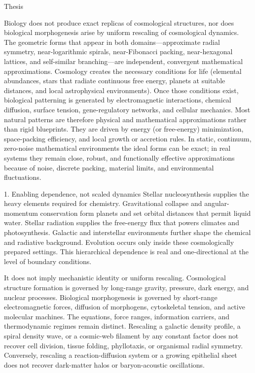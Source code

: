 Thesis

Biology does not produce exact replicas of cosmological structures, nor does biological morphogenesis arise by uniform rescaling of cosmological dynamics. The geometric forms that appear in both domains—approximate radial symmetry, near-logarithmic spirals, near-Fibonacci packing, near-hexagonal lattices, and self-similar branching—are independent, convergent mathematical approximations. Cosmology creates the necessary conditions for life (elemental abundances, stars that radiate continuous free energy, planets at suitable distances, and local astrophysical environments). Once those conditions exist, biological patterning is generated by electromagnetic interactions, chemical diffusion, surface tension, gene-regulatory networks, and cellular mechanics. Most natural patterns are therefore physical and mathematical approximations rather than rigid blueprints. They are driven by energy (or free-energy) minimization, space-packing efficiency, and local growth or accretion rules. In static, continuum, zero-noise mathematical environments the ideal forms can be exact; in real systems they remain close, robust, and functionally effective approximations because of noise, discrete packing, material limits, and environmental fluctuations.

1. Enabling dependence, not scaled dynamics
Stellar nucleosynthesis supplies the heavy elements required for chemistry. Gravitational collapse and angular-momentum conservation form planets and set orbital distances that permit liquid water. Stellar radiation supplies the free-energy flux that powers climates and photosynthesis. Galactic and interstellar environments further shape the chemical and radiative background. Evolution occurs only inside these cosmologically prepared settings. This hierarchical dependence is real and one-directional at the level of boundary conditions.

It does not imply mechanistic identity or uniform rescaling. Cosmological structure formation is governed by long-range gravity, pressure, dark energy, and nuclear processes. Biological morphogenesis is governed by short-range electromagnetic forces, diffusion of morphogens, cytoskeletal tension, and active molecular machines. The equations, force ranges, information carriers, and thermodynamic regimes remain distinct. Rescaling a galactic density profile, a spiral density wave, or a cosmic-web filament by any constant factor does not recover cell division, tissue folding, phyllotaxis, or organismal radial symmetry. Conversely, rescaling a reaction-diffusion system or a growing epithelial sheet does not recover dark-matter halos or baryon-acoustic oscillations.

